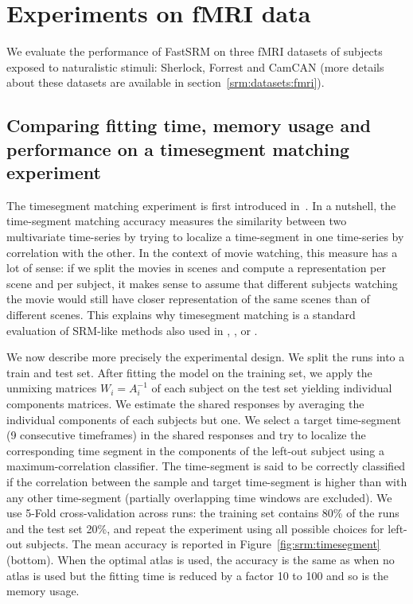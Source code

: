 \section{Experiments on fMRI data}
We evaluate the performance of FastSRM on three fMRI datasets of subjects
exposed to naturalistic stimuli: Sherlock, Forrest and CamCAN (more details
about these datasets are available in section~\ref{srm:datasets:fmri}).
\subsection{Comparing fitting time, memory usage and performance on a
  timesegment matching experiment}
\label{sec:timesegment_expe}
\label{timesegment_expe}
The timesegment matching experiment is first introduced
in~\cite{chen2015reduced}.
In a nutshell, the time-segment matching accuracy measures the similarity between two multivariate time-series by trying to localize a time-segment in one time-series by correlation with the other.
In the context of movie watching, this measure has a lot of sense: if we split
the movies in scenes and compute a representation per scene and per subject, it makes
sense to assume that different subjects watching the movie would still have closer representation of the same scenes than of different scenes.
This explains why timesegment matching is a standard evaluation of SRM-like methods also used in  \cite{chen2015reduced}, \cite{guntupalli2018computational}, \cite{Nastase741975} or
\cite{zhang2016searchlight}.

We now describe more precisely the experimental design.
We split the runs into a train and test set. After fitting the model on the
training set, we apply the unmixing matrices $W_i=A_i^{-1}$ of each subject on the test set yielding individual components matrices. We estimate the shared responses by averaging the individual components of each subjects but one.  We select a target time-segment (9 consecutive timeframes) in the shared responses and try to localize the corresponding time segment in the components of the left-out subject using a maximum-correlation classifier.
The time-segment is said to be
correctly classified if the correlation between the sample and target
time-segment is higher than with any other time-segment (partially overlapping time windows are excluded).
% 
We use 5-Fold cross-validation across runs: the training set contains 80\% of the runs and the test set 20\%, and repeat the experiment using all possible choices for left-out subjects. 
% 
The mean accuracy is reported in Figure~\ref{fig:srm:timesegment} (bottom).  When the
optimal atlas is used, the accuracy is the same as when no atlas is used but
the fitting time is reduced by a factor 10 to 100 and so is the memory usage.
% 

